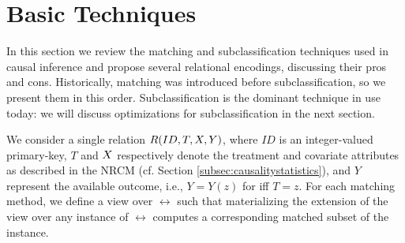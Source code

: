 
\section{Basic Techniques}
\label{sec:BasicTechniques}





In this section we review the matching and subclassification
techniques used in causal inference and propose several relational
encodings, discussing their pros and cons.  Historically, matching was
introduced before subclassification, so we present them in this order.
Subclassification is the dominant technique in use today: we will
discuss optimizations for subclassification in the next section.

We consider a single relation ${{R}}(ID,T,{{X}},Y)$,
where $ID$ is an integer-valued primary-key, $T$ and ${{X}}$
respectively denote the treatment and covariate attributes as
described in the NRCM (cf. Section \ref{subsec:causalitystatistics}),
and $Y$ represent the available outcome, i.e., $Y=Y(z)$ for iff $T=z$. For each matching method, we define a view over $\rel$ such that
materializing the extension of the view over any instance of $\rel$
computes a corresponding matched subset of the instance.


\vspace{0.3cm}


